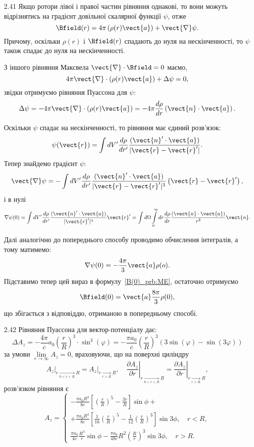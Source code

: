\begin{Solution}{2.{41}}
	Якщо ротори лівої і правої частин рівняння однакові, то вони можуть відрізнятись на градієнт довільної скалярної функції $\psi$, отже
	\begin{equation}\label{B(0)_prb:ME}
		\Bfield(r) = 4\pi \left( \rho(r) \vect{a}\right) + \vect{\nabla}\psi.
	\end{equation}
	Причому, оскільки $\rho(r)$   і $\Bfield(r)$  спадають до нуля на нескінченності,  то $\psi$  також спадає до нуля на нескінченності.

	З іншого рівняння Максвела $\vect{\nabla} \cdot \Bfield = 0$ маємо,
	\[
		4\pi \vect{\nabla} \cdot \left( {\rho (r){\vect{a}}} \right) + \Delta \psi  = 0,
	\]
	звідки отримуємо рівняння Пуассона для $\psi$:
	\[
		\Delta \psi = - 4\pi \vect{\nabla} \cdot \left( {\rho (r){\vect{a}}} \right) = - 4\pi\frac{d\rho}{dr} \left( \vect{n} \cdot \vect{a} \right).
	\]

	Оскільки $\psi$ спадає на нескінченності, то рівняння має єдиний розв'язок:
	\[
		\psi (\vect{r}) = \int dV' \frac{d\rho}{dr'}\frac{(\vect{n}'\cdot \vect{a})}{|\vect{r} - \vect{r}'|}.
	\]
	Тепер знайдемо градієнт $\psi$:
	\[
		\vect{\nabla}\psi = - \int {dV'} \frac{d\rho}{dr'}\frac{(\vect{n}' \cdot \vect{a})}{|\vect{r} - \vect{r}'|^3}\left( {\vect{r} - \vect{r}'} \right),
	\]
	і в нулі
	\[
		\nabla \psi (0) = \int dV' \frac{d\rho}{dr'}\frac{(\vect{n}' \cdot \vect{a})}{|\vect{r}'|^3} \vect{r}'= \int {d\Omega} \int\limits_0^\infty  dr \frac{d\rho}{dr}\frac{(\vect{n} \cdot \vect{a})}{r^2}{\vect{n}}.
	\]

	Далі аналогічно до попереднього способу проводимо обчислення інтегралів, а тому матимемо:
	\[
		\nabla \psi (0) = -\frac{4\pi}{3}\vect{a}\rho(o).
	\]
	Підставимо тепер цей вираз в формулу~\eqref{B(0)_prb:ME}, остаточно отримуємо
	\[
		\Bfield(0) = \vect{a}\frac{8\pi}{3}\rho(0),
	\]
	що збігається з відповіддю, отриманою в попередньому способі.
\end{Solution}
\begin{Solution}{2.{42}}
	Рівняння Пуассона для вектор-потенціалу дає:
	\[\Delta {A_z} =  - \frac{{4\pi }}{c}{a_0}{\left( {\frac{r}{R}} \right)^3} \cdot {\sin ^3}(\varphi ) =  - \frac{{\pi {a_0}}}{c}{\left( {\frac{r}{R}} \right)^3}\left( {3\sin (\varphi ) - \sin (3\varphi )} \right)
	\]
    за умови $\lim\limits_{r\to\infty} A_z = 0$, враховуючи, що на поверхні циліндру
    \[
        \left. A_z\right|_{r \underset{0<r<R}{\to} R} = \left. A_z\right|_{r \underset{r>R}{\to} R}, \quad  \left. \frac{\partial A_z}{\partial r}\right|_{r \underset{0<r<R}{\to} R} = \left. \frac{\partial A_z}{\partial r}\right|_{r \underset{r>R}{\to} R},
    \]
розв'язком рівняння є
	\[
		A_z =
		\begin{cases}
			- \frac{\pi a_0R^2}{8c}\left[ \left( \frac{r}{R} \right)^5 - \frac{3r}{R} \right] \sin\phi  + \\ +  \frac{\pi a_0R^2}{8c}\left[ \frac{1}{16}{\left( \frac{r}{R} \right)^5} - \frac{1}{12} \left( \frac{r}{R} \right)^3 \right]  \sin3\phi, \quad r < R, \\
			\frac{\pi a_0}{4c}\frac{R^3}{r} \sin\phi  - \frac{{\pi {a_0}}}{{48c}}{R^2}{\left( {\frac{R}{r}} \right)^3}  \sin3\phi, \quad r > R.
		\end{cases}
	\]
\end{Solution}
